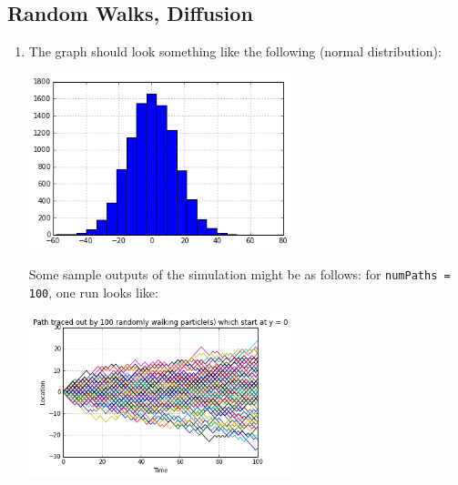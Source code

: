 \documentclass[12pt]{article}
\begin{document}
\subsection{Random Walks, Diffusion}
\begin{enumerate}
\item The graph should look something like the following (normal distribution):
\begin{center}
\includegraphics[width=0.6\textwidth]{diff1.png}
\end{center}

Some sample outputs of the simulation might be as follows: for \verb|numPaths = 100|, one run looks like:
\begin{center}
\includegraphics[width=0.6\textwidth]{diff1b.png}
\end{center}


\end{enumerate}
\end{document}
